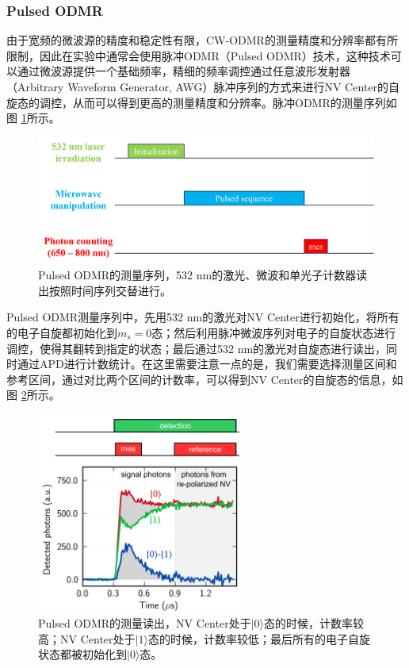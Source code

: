 \documentclass[type = bachelor, oneside]{whu-thesis}
\begin{document}
\subsubsection{Pulsed ODMR}

由于宽频的微波源的精度和稳定性有限，CW-ODMR的测量精度和分辨率都有所限制，因此在实验中通常会使用脉冲ODMR（Pulsed ODMR）技术，这种技术可以通过微波源提供一个基础频率，精细的频率调控通过任意波形发射器（Arbitrary Waveform Generator, AWG）脉冲序列的方式来进行NV Center的自旋态的调控，从而可以得到更高的测量精度和分辨率。脉冲ODMR的测量序列如图 \ref{fig: Pulsed ODMR_seq}所示。

\begin{figure}
  \centering
  \includegraphics[width=1.0\textwidth]{figures/Chapter 2/Pulsed ODMR_seq.png}
  \caption[Pulsed ODMR的测量序列]{Pulsed ODMR的测量序列，532 nm的激光、微波和单光子计数器读出按照时间序列交替进行。}
  \label{fig: Pulsed ODMR_seq}
\end{figure}

Pulsed ODMR测量序列中，先用532 nm的激光对NV Center进行初始化，将所有的电子自旋都初始化到$m_s=0$态；然后利用脉冲微波序列对电子的自旋状态进行调控，使得其翻转到指定的状态；最后通过532 nm的激光对自旋态进行读出，同时通过APD进行计数统计。在这里需要注意一点的是，我们需要选择测量区间和参考区间，通过对比两个区间的计数率，可以得到NV Center的自旋态的信息，如图 \ref{fig: mes_ref}所示。

\begin{figure}
  \centering
  \includegraphics[width=0.6\textwidth]{figures/Chapter 2/mes_ref.png}
  \caption[Pulsed ODMR的测量读出]{Pulsed ODMR的测量读出，NV Center处于$|0\rangle$态的时候，计数率较高；NV Center处于$|1\rangle$态的时候，计数率较低；最后所有的电子自旋状态都被初始化到$|0\rangle$态\cite{Staudacher2015}。}
  \label{fig: mes_ref}
\end{figure}
\end{document}
